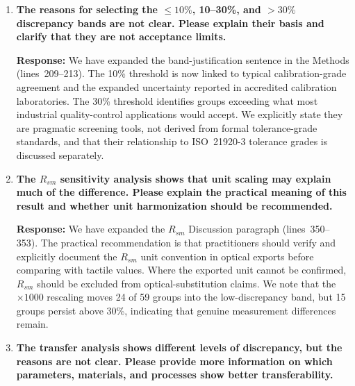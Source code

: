 \documentclass[10pt]{article}
\begin{document}
\begin{enumerate}[leftmargin=*, label=\textbf{Comment \arabic*.}, ref=\arabic*]
\textbf{Response:} A new paragraph has been added in the Discussion (lines~358--360) explaining that optical repeat measurements were retained less consistently than tactile repeats, that a limited sensitivity check on groups with partial optical replication indicated that optical repeatability SDs are generally smaller than the between-workflow discrepancy medians, but that this check cannot substitute for a designed gauge R\&R study. We note that the optical side is an archived-output comparison rather than a repeatability-qualified measurement.

\item \textbf{The reasons for selecting the $\leq 10\%$, 10--30\%, and $>30\%$ discrepancy bands are not clear. Please explain their basis and clarify that they are not acceptance limits.}

\textbf{Response:} We have expanded the band-justification sentence in the Methods (lines~209--213). The 10\% threshold is now linked to typical calibration-grade agreement and the expanded uncertainty reported in accredited calibration laboratories. The 30\% threshold identifies groups exceeding what most industrial quality-control applications would accept. We explicitly state they are pragmatic screening tools, not derived from formal tolerance-grade standards, and that their relationship to ISO~21920-3 tolerance grades is discussed separately.

\item \textbf{The $R_{sm}$ sensitivity analysis shows that unit scaling may explain much of the difference. Please explain the practical meaning of this result and whether unit harmonization should be recommended.}

\textbf{Response:} We have expanded the $R_{sm}$ Discussion paragraph (lines~350--353). The practical recommendation is that practitioners should verify and explicitly document the $R_{sm}$ unit convention in optical exports before comparing with tactile values. Where the exported unit cannot be confirmed, $R_{sm}$ should be excluded from optical-substitution claims. We note that the $\times 1000$ rescaling moves 24 of 59 groups into the low-discrepancy band, but 15 groups persist above 30\%, indicating that genuine measurement differences remain.

\item \textbf{The transfer analysis shows different levels of discrepancy, but the reasons are not clear. Please provide more information on which parameters, materials, and processes show better transferability.}


\end{enumerate}
\end{document}
